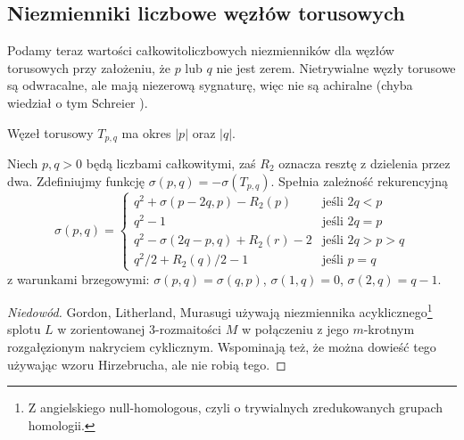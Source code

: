 
\subsection{Niezmienniki liczbowe węzłów torusowych}
Podamy teraz wartości całkowitoliczbowych niezmienników dla węzłów torusowych przy założeniu, że $p$ lub $q$ nie jest zerem.
Nietrywialne węzły torusowe są odwracalne, ale mają niezerową sygnaturę, więc nie są achiralne (chyba wiedział o tym Schreier \cite{schreier24}).

\begin{proposition}
%
    Węzeł torusowy $T_{p, q}$ ma okres $|p|$ oraz $|q|$.
\end{proposition}

\begin{proposition}
%
    Niech $p, q > 0$ będą liczbami całkowitymi, zaś $R_2$ oznacza resztę z dzielenia przez dwa.
    Zdefiniujmy funkcję $\sigma(p, q) = - \sigma(T_{p, q})$.
    Spełnia zależność rekurencyjną
    \begin{equation}
        \sigma(p, q) = \begin{cases}
             q^2 + \sigma(p-2q, p) - R_2(p)       & \text{jeśli } 2q < p \\
             q^2 - 1                              & \text{jeśli } 2q = p \\
             q^2 - \sigma(2q - p, q) + R_2(r) - 2 & \text{jeśli } 2q > p > q \\
             q^2/2 + R_2(q)/2 - 1                 & \text{jeśli } p = q
        \end{cases}
    \end{equation}
    z warunkami brzegowymi: $\sigma(p, q) = \sigma(q, p)$, $\sigma(1, q) = 0$, $\sigma(2, q) = q-1$.
\end{proposition}

\begin{proof}[Niedowód]
%
%
%
    Gordon, Litherland, Murasugi \cite[tw. 5.2]{litherland81} używają niezmiennika acyklicznego\footnote{Z angielskiego null-homologous, czyli o trywialnych zredukowanych grupach homologii.} splotu $L$ w zorientowanej 3-rozmaitości $M$ w połączeniu z jego $m$-krotnym rozgałęzionym nakryciem cyklicznym.
    Wspominają też, że można dowieść tego używając wzoru Hirzebrucha, ale nie robią tego.
\end{proof}

